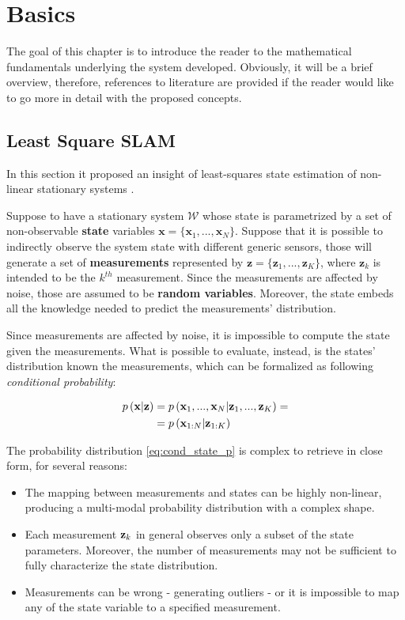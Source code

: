 \chapter{Basics}\label{ch:basics}
The goal of this chapter is to introduce the reader to the mathematical fundamentals underlying the system developed. Obviously, it will be a brief overview, therefore, references to literature are provided if the reader would like to go more in detail with the proposed concepts.

\section{Least Square SLAM}\label{sec:ls_formulation}
In this section it proposed an insight of least-squares state estimation of non-linear stationary systems \cite{charnes1976least-squares}.

Suppose to have a stationary system $\mathcal{W}$ whose state is parametrized by a set of non-observable \textbf{state} variables $\mathbf{x} = \{\mathbf{x}_1, ..., \mathbf{x}_N\}$. Suppose that it is possible to indirectly observe the system state with different generic sensors, those will generate a set of \textbf{measurements} represented by $\mathbf{z} = \{\mathbf{z}_1, ..., \mathbf{z}_K\}$, where $\mathbf{z}_k$ is intended to be the $k^{th}$ measurement. Since the measurements are affected by noise, those are assumed to be \textbf{random variables}. Moreover, the state embeds all the knowledge needed to predict the measurements' distribution.

Since measurements are affected by noise, it is impossible to compute the state given the measurements. What is possible to evaluate, instead, is the states' distribution known the measurements, which can be formalized as following \textit{conditional probability}:

\begin{align} 
    p\left(\mathbf{x} | \mathbf{z}\right) &= p\left(\mathbf{x}_1, ..., \mathbf{x}_N | \mathbf{z}_1, ..., \mathbf{z}_K\right) = \nonumber \\
    &= p\left(\mathbf{x}_{1:N} | \mathbf{z}_{1:K}\right)
    \label{eq:cond_state_p}
\end{align}

The probability distribution \ref{eq:cond_state_p} is complex to retrieve in close form, for several reasons: 
\begin{itemize}
    \item The mapping between measurements and states can be highly non-linear, producing a multi-modal probability distribution with a complex shape.
    \item Each measurement $\mathbf{z}_k$ in general observes only a subset of the state parameters. Moreover, the number of measurements may not be sufficient to fully characterize the state distribution.
    \item Measurements can be wrong - generating outliers - or it is impossible to map any of the state variable to a specified measurement.
\end{itemize}

